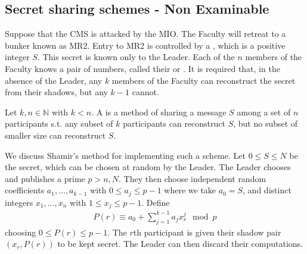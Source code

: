 \subsection{Secret sharing schemes - Non Examinable}
Suppose that the CMS is attacked by the MIO.
The Faculty will retreat to a bunker known as MR2.
Entry to MR2 is controlled by a , which is a positive integer $S$.
This secret is known only to the Leader.
Each of the $n$ members of the Faculty knows a pair of numbers, called their  or .
It is required that, in the absence of the Leader, any $k$ members of the Faculty can reconstruct the secret from their shadows, but any $k-1$ cannot.
\begin{definition}
    Let $k, n \in \mathbb N$ with $k < n$.
    A  is a method of sharing a message $S$ among a set of $n$ participants s.t. any subset of $k$ participants can reconstruct $S$, but no subset of smaller size can reconstruct $S$.
\end{definition}
We discuss Shamir's method for implementing such a scheme.
Let $0 \leq S \leq N$ be the secret, which can be chosen at random by the Leader.
The Leader chooses and publishes a prime $p > n, N$.
They then choose independent random coefficients $a_1, \dots, a_{k-1}$ with $0 \leq a_j \leq p-1$ where we take $a_0 = S$, and distinct integers $x_1, \dots, x_n$ with $1 \leq x_j \leq p-1$.
Define
\begin{align*}
    P(r) \equiv a_0 + \sum_{j=1}^{k-1} a_j x_r^j \mod p
\end{align*}
choosing $0 \leq P(r) \leq p-1$.
The $r$th participant is given their shadow pair $(x_r, P(r))$ to be kept secret.
The Leader can then discard their computations.

